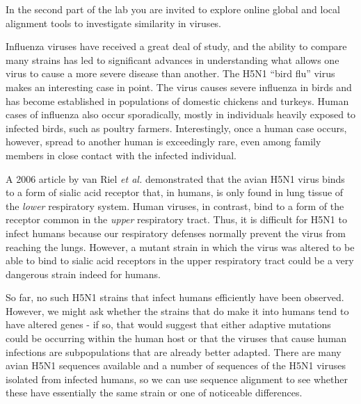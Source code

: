 

In the second part of the lab you are invited to explore online global and local alignment tools to investigate similarity in viruses. 

\noindent Influenza viruses have received a great deal of study, and the ability to compare many strains has led to significant advances in understanding what allows one virus to cause a more severe disease than another. The H5N1 ``bird flu'' virus makes an interesting case in point. The virus causes severe influenza in birds and has become established in populations of domestic chickens and turkeys.  Human cases of influenza also occur sporadically, mostly in individuals heavily exposed to infected birds, such as poultry farmers. Interestingly, once a human case occurs, however, spread to another human is exceedingly rare, even among family members in close contact with the infected individual.  

\noindent A 2006 article by van Riel \emph{et al.} demonstrated that the avian H5N1 virus binds to a form of sialic acid receptor that, in humans, is only found in lung tissue of the \emph{lower} respiratory system. Human viruses, in contrast, bind to a form of the receptor common in the \emph{upper} respiratory tract. Thus, it is difficult for H5N1 to infect humans because our respiratory defenses normally prevent the virus from reaching the lungs. However, a mutant strain in which the virus was altered to be able to bind to sialic acid receptors in the upper respiratory tract could be a very dangerous strain indeed for humans.

\noindent So far, no such H5N1 strains that infect humans efficiently have been observed. However, we might ask whether the strains that do make it into humans tend to have altered genes  - if so, that would suggest that either adaptive mutations could be occurring within the human host or that the viruses that cause human infections are subpopulations that are already better adapted. There are many avian H5N1 sequences available and a number of sequences of the H5N1 viruses isolated from infected humans, so we can use sequence alignment to see whether these have essentially the same strain or one of noticeable differences.

